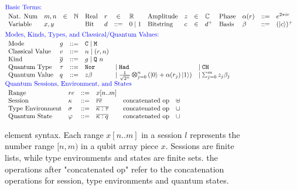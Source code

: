 \begin{figure}[t]
{ \small
\[\hspace*{-0.5em}
\begin{array}{l}
\textcolor{blue}{\text{Basic Terms:}}\\[0.2em]
\begin{array}{llcl llcl llcl llcl}
\text{Nat. Num} & m, n & \in & \mathbb{N}
&
      \text{Real} & r & \in & \mathbb{R}
&
      \text{Amplitude} & z & \in & \mathbb{C}
&
\text{Phase} & \alpha(r) & ::= & e^{2\pi i r}

\\
      \text{Variable} & x,y &&

 & \text{Bit} & d & ::= & 0\mid 1       
&
      \text{Bitstring} & c & \in & d^{+}
&
      \text{Basis}& \beta & ::= & (\ket{c})^+
\end{array}
\\[1em]
\textcolor{blue}{\text{Modes, Kinds, Types, and Classical/Quantum Values:}}\\[0.2em]
\begin{array}{llclll} 
      \text{Mode} & g & ::= & \cmode  \mid \mmode\\
      \text{Classical Value} & v & ::= & n \mid (r,n)\\
      \text{Kind} & \overline{g} & ::= & g \mid \qmode{n} \\
      \text{Quantum Type} & \tau & ::= & \tnort &\mid \thadt & \mid \tcht \\
      \text{Quantum Value} & q & ::= & z\beta & \mid \shad{2^n}{n}{\alpha(r_j)} &\mid \ssum{j=0}{m}{z_j\beta_j} \\
    \end{array}
\\[1em]
\textcolor{blue}{\text{Quantum Sessions, Environment, and States}}\\[0.2em]
\begin{array}{llclcl} 
      \text{Range} & re & ::= & x[n..m] \\
      \text{Session} & \kappa & ::= & \overline{re} & \text{concatenated op} & \uplus \\
      \text{Type Environment} & \sigma & ::= & \overline{\kappa : \tau } & \text{concatenated op} & \cup \\
      \text{Quantum State} & \varphi & ::= & \overline{ \kappa : q } & \text{concatenated op} & \cup \\
    \end{array}
\end{array}
  \]
}
  \caption{\qafny element syntax. Each range $x[n..m]$ in a session $l$ represents the number range $[n,m)$ in a qubit array piece $x$. Sessions are finite lists, while type environments and states are finite sets. the operations after "concatenated op" refer to the concatenation operations for session, type environments and quantum states. }
  \label{fig:qafny-state}
\end{figure}

